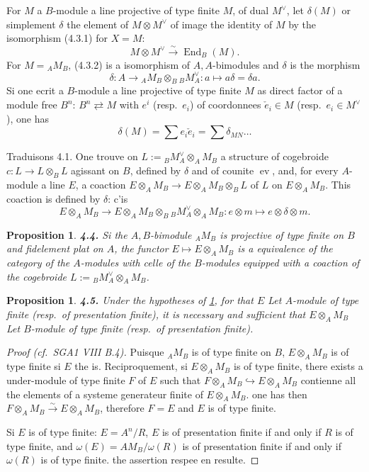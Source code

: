 \documentclass[12pt,a4paper]{article}
\theoremstyle{plain}
\newtheorem{proposition}[theorem]{Proposition}
\theoremstyle{definition}
\theoremstyle{remark}
\DeclareMathOperator{\End}{End}
\DeclareMathOperator{\ev}{ev}
\begin{document}
For $M$ a $B$-module a line projective of type finite $M$, of dual $M^\vee$, let $\delta(M)$ or simplement $\delta$ the element of $M \otimes M^\vee$ of image the identity of $M$ by the isomorphism (4.3.1) for $X = M$:
\begin{equation}\label{eq:4.3.2}
M \otimes M^\vee \xrightarrow{\sim} \End_B(M).
\end{equation}
For $M = {}_A M_B$, (4.3.2) is a isomorphism of $A,A$-bimodules and $\delta$ is the morphism
\[
\delta : A \to {}_A M_B \otimes_B {}_B M_A^\vee : a \mapsto a\delta = \delta a.
\]
Si one ecrit a $B$-module a line projective of type finite $M$ as direct factor of a module free $B^n$: $B^n \rightleftarrows M$ with $e^i$ (resp.~$e_i$) of coordonnees $\check{e}_i \in M$ (resp.~$e_i \in M^\vee$), one has
\begin{equation}\label{eq:4.3.3}
\delta(M) = \sum e_i \check{e}_i = \sum \delta_{MN} \ldots
\end{equation}

Traduisons 4.1. One trouve on $L := {}_B M_A^\vee \otimes_A M_B$ a structure of cogebroide $c : L \to L \otimes_B L$ agissant on $B$, defined by $\delta$ and of counite $\ev$, and, for every $A$-module a line $E$, a coaction $E \otimes_A M_B \to E \otimes_A M_B \otimes_B L$ of $L$ on $E \otimes_A M_B$. This coaction is defined by $\delta$: c'is
\[
E \otimes_A M_B \to E \otimes_A M_B \otimes_B {}_B M_A^\vee \otimes_A M_B : e \otimes m \mapsto e \otimes \delta \otimes m.
\]

\begin{proposition}\label{prop:4.4}
\textbf{4.4.} Si the $A,B$-bimodule ${}_A M_B$ is projective of type finite on $B$ and fidelement plat on $A$, the functor $E \mapsto E \otimes_A M_B$ is a equivalence of the category of the $A$-modules with celle of the $B$-modules equipped with a coaction of the cogebroide $L := {}_B M_A^\vee \otimes_A M_B$.
\end{proposition}

\begin{proposition}\label{prop:4.5}
\textbf{4.5.} Under the hypotheses of \ref{prop:4.4}, for that $E$ Let $A$-module of type finite (resp.~of presentation finite), it is necessary and sufficient that $E \otimes_A M_B$ Let $B$-module of type finite (resp.~of presentation finite).
\end{proposition}

\begin{proof}[Proof (cf.~SGA1 VIII B.4)]
Puisque ${}_A M_B$ is of type finite on $B$, $E \otimes_A M_B$ is of type finite si $E$ the is. Reciproquement, si $E \otimes_A M_B$ is of type finite, there exists a under-module of type finite $F$ of $E$ such that $F \otimes_A M_B \hookrightarrow E \otimes_A M_B$ contienne all the elements of a systeme generateur finite of $E \otimes_A M_B$. one has then $F \otimes_A M_B \xrightarrow{\sim} E \otimes_A M_B$, therefore $F = E$ and $E$ is of type finite.

Si $E$ is of type finite: $E = A^n/R$, $E$ is of presentation finite if and only if $R$ is of type finite, and $\omega(E) = A M_B / \omega(R)$ is of presentation finite if and only if $\omega(R)$ is of type finite. the assertion respee en resulte.
\end{proof}
\end{document}
